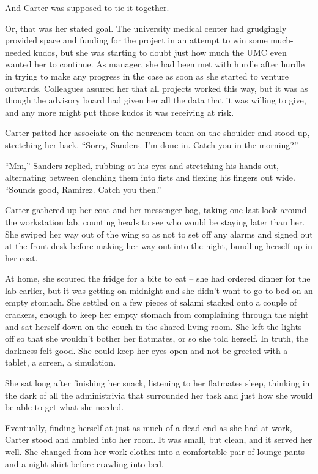 And Carter was supposed to tie it together.

Or, that was her stated goal.  The university medical center had grudgingly provided space and funding for the project in an attempt to win some much-needed kudos, but she was starting to doubt just how much the UMC even wanted her to continue.  As manager, she had been met with hurdle after hurdle in trying to make any progress in the case as soon as she started to venture outwards.  Colleagues assured her that all projects worked this way, but it was as though the advisory board had given her all the data that it was willing to give, and any more might put those kudos it was receiving at risk.

Carter patted her associate on the neurchem team on the shoulder and stood up, stretching her back.  ``Sorry, Sanders.  I'm done in.  Catch you in the morning?''

``Mm,'' Sanders replied, rubbing at his eyes and stretching his hands out, alternating between clenching them into fists and flexing his fingers out wide.  ``Sounds good, Ramirez.  Catch you then.''

Carter gathered up her coat and her messenger bag, taking one last look around the workstation lab, counting heads to see who would be staying later than her.  She swiped her way out of the wing so as not to set off any alarms and signed out at the front desk before making her way out into the night, bundling herself up in her coat.

At home, she scoured the fridge for a bite to eat -- she had ordered dinner for the lab earlier, but it was getting on midnight and she didn't want to go to bed on an empty stomach.  She settled on a few pieces of salami stacked onto a couple of crackers, enough to keep her empty stomach from complaining through the night and sat herself down on the couch in the shared living room.  She left the lights off so that she wouldn't bother her flatmates, or so she told herself.  In truth, the darkness felt good.  She could keep her eyes open and not be greeted with a tablet, a screen, a simulation.

She sat long after finishing her snack, listening to her flatmates sleep, thinking in the dark of all the administrivia that surrounded her task and just how she would be able to get what she needed.

Eventually, finding herself at just as much of a dead end as she had at work, Carter stood and ambled into her room.  It was small, but clean, and it served her well.  She changed from her work clothes into a comfortable pair of lounge pants and a night shirt before crawling into bed.

